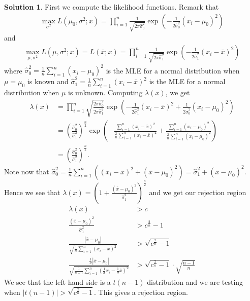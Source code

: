 \documentclass[11pt]{amsart}
\theoremstyle{definition}
\newtheorem{solution}[theorem]{Solution}
\numberwithin{equation}{section}
\begin{document}
\addtocounter{theorem}{-1}
\begin{solution}
    First we compute the likelihood functions. Remark that
    \begin{align*}
        \max_{\sigma^2}L(\mu_0,\sigma^2;x)=\prod_{i=1}^n\frac{1}{\sqrt{2\pi\hat{\sigma}_0^2}}\exp(-\frac{1}{2\hat{\sigma}_0^2}(x_i-\mu_0)^2)
    \end{align*}
    and
    \begin{align*}
        \max_{\mu,\sigma^2} L(\mu,\sigma^2;x)=L(\bar x;x)=\prod_{i=1}^n\frac{1}{\sqrt{2\pi\hat\sigma^2_1}}\exp(-\frac{1}{2\hat\sigma^2_1}(x_i-\bar x)^2)
    \end{align*}
    where $\hat\sigma^2_0=\frac{1}{n}\sum_{i=1}^n(x_i-\mu_0)^2$ is the MLE for a normal distribution when $\mu=\mu_0$ is known and $\hat\sigma^2_1=\frac{1}{n}\sum_{i=1}^n(x_i-\bar x)^2$ is the MLE for a normal distribution when $\mu$ is unknown. Computing $\lambda(x)$, we get
    \begin{align*}
        \lambda(x)&=\prod_{i=1}^n\sqrt{\frac{2\pi\hat\sigma_0^2}{2\pi\hat\sigma_1^2}}\exp(-\frac{1}{2\hat\sigma_1^2}(x_i-\bar x)^2+\frac{1}{2\hat\sigma_0^2}(x_i-\mu_0)^2)\\
        &=\left(\frac{\hat\sigma_0^2}{\hat\sigma_1^2}\right)^\frac{n}{2}\exp\left(-\frac{\sum_{i=1}^n(x_i-\bar x)^2}{\frac{2}{n}\sum_{i=1}^n(x_i-\bar x)^2}+ \frac{\sum_{i=1}^n(x_i-\mu_0)^2}{\frac{2}{n}\sum_{i=1}^n(x_i-\mu_0)^2} \right)\\
        &=\left(\frac{\hat\sigma_0^2}{\hat\sigma_1^2}\right)^\frac{n}{2}.
    \end{align*}
    Note now that $\hat\sigma_0^2=\frac{1}{n}\sum_{i=1}^n((x_i-\bar x)^2+(\bar x-\mu_0)^2)=\hat\sigma_1^2+(\bar x-\mu_0)^2$. Hence we see that $\lambda(x)=(1+\frac{(\bar x-\mu_0)^2}{\hat\sigma_1^2})^\frac{n}{2}$ and we get our rejection region
    \begin{align*}
        \lambda(x)&>c\\
        \frac{(\bar x-\mu_0)^2}{\hat\sigma_1^2}&>c^{\frac{2}{n}}-1\\
        \frac{|\bar x-\mu_0|}{\sqrt{\frac{1}{n}\sum_{i=1}^n(x_i-\bar x)^2}}&>\sqrt{c^\frac{2}{n}-1}\\
        \frac{\frac{1}{\sigma}|\bar x-\mu_0|}{\sqrt{\frac{1}{n-1}\sum_{i=1}^n(\frac{1}{\sigma}x_i-\frac{1}{\sigma}\bar x)^2}}&>\sqrt{c^{\frac{2}{n}}-1}\cdot\sqrt{\frac{n-1}{n}}
    \end{align*}
    We see that the left hand side is a $t(n-1)$ distribution and we are testing when $|t(n-1)|>\sqrt{c^{\frac{2}{n}}-1}$. This gives a rejection region.
\end{solution}
\end{document}
